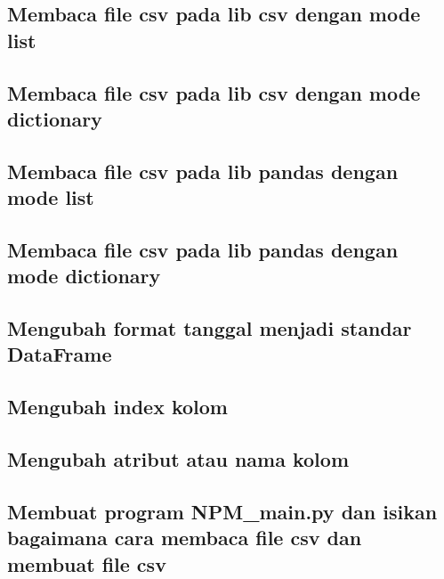 \subsection{Membaca file csv pada lib csv dengan mode list}


\subsection{ Membaca file csv pada lib csv dengan mode dictionary}


\subsection{Membaca file csv pada lib pandas dengan mode list}


\subsection{Membaca file csv pada lib pandas dengan mode dictionary}


\subsection{Mengubah format tanggal menjadi standar DataFrame}

	
\subsection{Mengubah index kolom}


\subsection{Mengubah atribut atau nama kolom}


\subsection{Membuat program NPM\_main.py dan isikan bagaimana cara membaca file csv dan membuat file csv}

	
